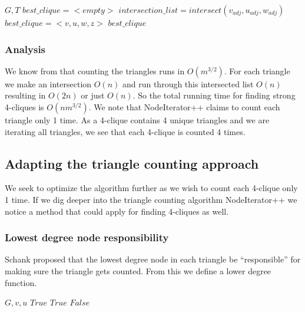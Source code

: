 \documentclass{article}
\begin{document}
\begin{algorithm}
\caption{$strong\_4clique\_finder+$}
\begin{algorithmic}
\REQUIRE $G,T$
\STATE $best\_clique = <empty>$
\STATE $intersection\_list = intersect(v_{adj}, u_{adj}, w_{adj})$
\STATE $best\_clique = <v,u,w,z>$
\ENDIF
\ENDFOR
\ENDIF
\ENDFOR
\RETURN $best\_clique$
\end{algorithmic}
\end{algorithm}

\subsubsection{Analysis}
We know from \cite{countingTriangles} that counting the triangles runs in $O(m^{3/2})$. For each triangle we make an intersection $O(n)$ and run through this intersected list $O(n)$ resulting in $O(2n)$ or just $O(n)$. So the total running time for finding strong 4-cliques is $O(nm^{3/2})$. We note that NodeIterator++ claims to count each triangle only 1 time. As a 4-clique contains 4 unique triangles and we are iterating all triangles, we see that each 4-clique is counted 4 times.

\subsection{Adapting the triangle counting approach}
We seek to optimize the algorithm further as we wish to count each 4-clique only 1 time. If we dig deeper into the triangle counting algorithm NodeIterator++ \cite{countingTriangles} we notice a method that could apply for finding 4-cliques as well.

\subsubsection{Lowest degree node responsibility}
Schank \cite{AlgorithmicAspects} proposed that the lowest degree node in each triangle be “responsible” for making sure the triangle gets counted. From this we define a lower degree function.

\begin{algorithm}
\caption{$lower\_degree$}
\begin{algorithmic}
\REQUIRE $G,v,u$
\RETURN $True$
\RETURN $True$
\ELSE
\RETURN $False$
\ENDIF
\end{algorithmic}
\end{algorithm}
\end{document}
